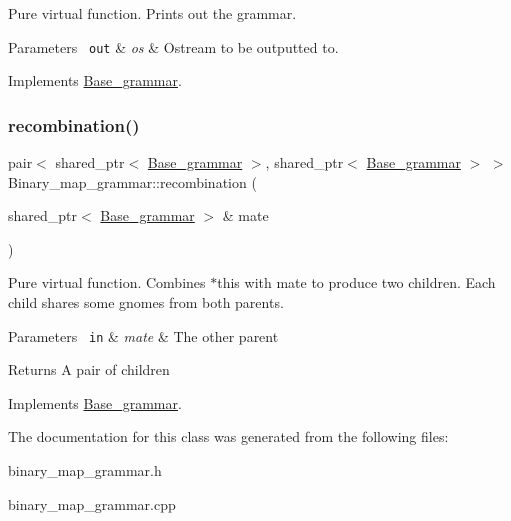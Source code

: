 Pure virtual function. Prints out the grammar. 


\begin{DoxyParams}[1]{Parameters}
\mbox{\texttt{ out}}  & {\em os} & Ostream to be outputted to. \\
\hline
\end{DoxyParams}


Implements \mbox{\hyperlink{classBase__grammar_acc90ffd8e04ba0a51750a15c158ce790}{Base\+\_\+grammar}}.

\mbox{\label{classBinary__map__grammar_a81761711a54269d1a48e196eaa3fe9e4}} 
\subsubsection{\texorpdfstring{recombination()}{recombination()}}
{\footnotesize\ttfamily pair$<$ shared\+\_\+ptr$<$ \mbox{\hyperlink{classBase__grammar}{Base\+\_\+grammar}} $>$, shared\+\_\+ptr$<$ \mbox{\hyperlink{classBase__grammar}{Base\+\_\+grammar}} $>$ $>$ Binary\+\_\+map\+\_\+grammar\+::recombination (\begin{DoxyParamCaption}\item[{shared\+\_\+ptr$<$ \mbox{\hyperlink{classBase__grammar}{Base\+\_\+grammar}} $>$ \&}]{mate }\end{DoxyParamCaption})\hspace{0.3cm}{\ttfamily [virtual]}}



Pure virtual function. Combines $\ast$this with mate to produce two children. Each child shares some gnomes from both parents. 


\begin{DoxyParams}[1]{Parameters}
\mbox{\texttt{ in}}  & {\em mate} & The other parent \\
\hline
\end{DoxyParams}
\begin{DoxyReturn}{Returns}
A pair of children 
\end{DoxyReturn}


Implements \mbox{\hyperlink{classBase__grammar_a60e0296e1254df779af8be718d465696}{Base\+\_\+grammar}}.



The documentation for this class was generated from the following files\+:\begin{DoxyCompactItemize}
\item 
binary\+\_\+map\+\_\+grammar.\+h\item 
binary\+\_\+map\+\_\+grammar.\+cpp\end{DoxyCompactItemize}
